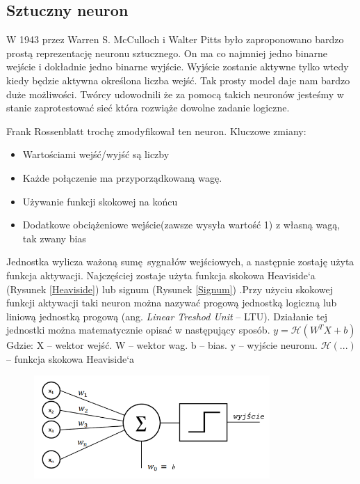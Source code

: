\documentclass{article}
\begin{document}
\subsection{Sztuczny neuron}
W 1943 przez Warren S. McCulloch i Walter Pitts było zaproponowano bardzo prostą reprezentację neuronu sztucznego. On ma co najmniej jedno binarne wejście i dokładnie jedno binarne wyjście. Wyjście zostanie aktywne tylko wtedy kiedy będzie aktywna określona liczba wejść. \cite{mcculloch1943logical} Tak prosty model daje nam bardzo duże możliwości. Twórcy udowodnili że za pomocą takich neuronów jesteśmy w stanie zaprotestować sieć która rozwiąże dowolne zadanie logiczne.

Frank Rossenblatt trochę zmodyfikował ten neuron.\newline
Kluczowe zmiany:
\begin{itemize}
	\item Wartościami wejść/wyjść są liczby
	\item Każde połączenie ma przyporządkowaną wagę.
	\item Używanie funkcji skokowej na końcu
	\item Dodatkowe obciążeniowe wejście(zawsze wysyła wartość 1) z własną wagą, tak zwany bias
\end{itemize}
Jednostka wylicza ważoną sumę sygnałów wejściowych, a następnie zostaję użyta funkcja aktywacji. Najczęściej zostaje użyta funkcja skokowa Heaviside`a (Rysunek \ref{Heaviside}) lub signum (Rysunek \ref{Signum}) .Przy użyciu skokowej funkcji aktywacji taki neuron można nazywać progową jednostką logiczną lub liniową jednostką progową (ang. \textit{Linear Treshod Unit} -- LTU). Działanie tej jednostki można matematycznie opisać w następujący sposób.\newline\newline
$ y = \mathcal{H}(W^{T}X + b) $\newline \newline
Gdzie: \newline
X -- wektor wejść. \newline
W -- wektor wag. \newline
b -- bias. \newline
y -- wyjście neuronu. \newline
$ \mathcal{H}(...) $ -- funkcja skokowa Heaviside`a\newline

\begin{figure}[H]
	\centering
	\includegraphics[width=0.8\textwidth,keepaspectratio=true]{neuron_rosenblatta}
\end{figure}
\end{document}
